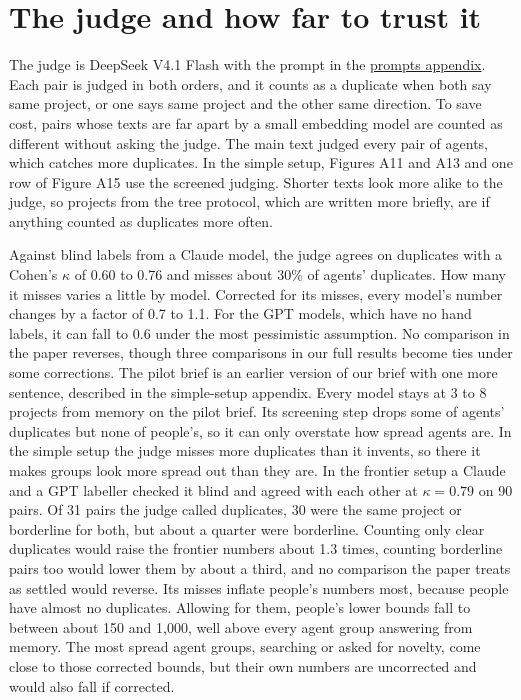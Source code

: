 \documentclass[11pt]{article}
\newcounter{none}
\begin{document}
\section{The judge and how far to trust
it}\label{appendix-the-judge-and-how-far-to-trust-it}

The judge is DeepSeek V4.1 Flash with the prompt in the
\href{https://github.com/AverroesLabs/ai-research-agent-diversity/blob/main/prompts/README.md}{prompts
appendix}. Each pair is judged in both orders, and it counts as a
duplicate when both say same project, or one says same project and the
other same direction. To save cost, pairs whose texts are far apart by a
small embedding model are counted as different without asking the judge.
The main text judged every pair of agents, which catches more
duplicates. In the simple setup, Figures A11 and A13 and one row of
Figure A15 use the screened judging. Shorter texts look more alike to
the judge, so projects from the tree protocol, which are written more
briefly, are if anything counted as duplicates more often.

Against blind labels from a Claude model, the judge agrees on duplicates
with a Cohen's \(\kappa\) of 0.60 to 0.76 and misses about 30\% of
agents' duplicates. How many it misses varies a little by model.
Corrected for its misses, every model's number changes by a factor of
0.7 to 1.1. For the GPT models, which have no hand labels, it can fall
to 0.6 under the most pessimistic assumption. No comparison in the paper
reverses, though three comparisons in our full results become ties under
some corrections. The pilot brief is an earlier version of our brief
with one more sentence, described in the simple-setup appendix. Every
model stays at 3 to 8 projects from memory on the pilot brief. Its
screening step drops some of agents' duplicates but none of people's, so
it can only overstate how spread agents are. In the simple setup the
judge misses more duplicates than it invents, so there it makes groups
look more spread out than they are. In the frontier setup a Claude and a
GPT labeller checked it blind and agreed with each other at
\(\kappa = 0.79\) on 90 pairs. Of 31 pairs the judge called duplicates,
30 were the same project or borderline for both, but about a quarter
were borderline. Counting only clear duplicates would raise the frontier
numbers about 1.3 times, counting borderline pairs too would lower them
by about a third, and no comparison the paper treats as settled would
reverse. Its misses inflate people's numbers most, because people have
almost no duplicates. Allowing for them, people's lower bounds fall to
between about 150 and 1,000, well above every agent group answering from
memory. The most spread agent groups, searching or asked for novelty,
come close to those corrected bounds, but their own numbers are
uncorrected and would also fall if corrected.
\end{document}
